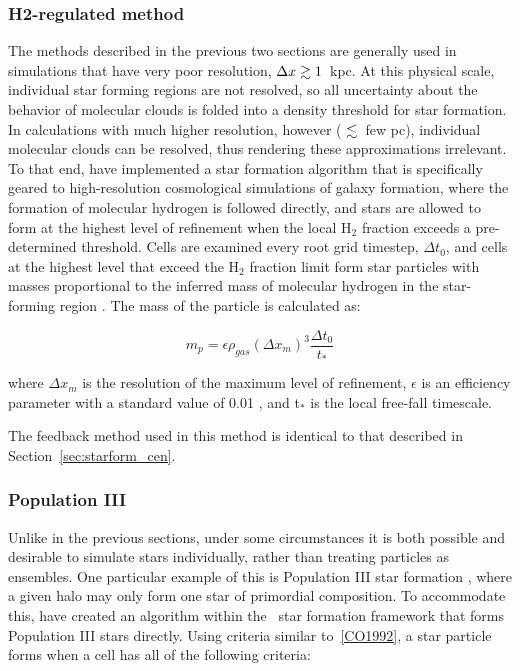 \subsubsection{H2-regulated method}
\label{sec:starform_H2reg}

The methods described in the previous two sections are generally used
in simulations that have very poor resolution, $\Delta x \gtrsim 1$~kpc.
At this physical scale, individual star forming regions are not
resolved, so all uncertainty about the behavior of molecular clouds is
folded into a density threshold for star formation.  In calculations
with much higher resolution, however ( $\lesssim$~few pc), individual
molecular clouds can be resolved, thus rendering these approximations
irrelevant.  To that end, \citet{2012ApJ...749...36K} have implemented
a star formation algorithm that is specifically geared to
high-resolution cosmological simulations of galaxy formation, where
the formation of molecular hydrogen is followed directly, and stars
are allowed to form at the highest level of refinement when the local
H$_2$ fraction exceeds a pre-determined threshold.  Cells are examined
every root grid timestep, $\Delta t_0$, and cells at the highest level
that exceed the H$_2$ fraction limit form star particles with masses
proportional to the inferred mass of molecular hydrogen in the
star-forming region
\citep{2008ApJ...689..865K,2009ApJ...693..216K,2010ApJ...709..308M}.
The mass of the particle is calculated as:

\begin{equation} 
m_p = \epsilon \rho_{gas} (\Delta x_{m})^3 \frac{\Delta t_0}{t_*}
\end{equation}

where $\Delta x_{m}$ is the resolution of the maximum level of
refinement, $\epsilon$ is an efficiency parameter with a standard
value of 0.01 \citep[as motivated by][]{2007ApJ...654..304K}, and
t$_*$ is the local free-fall timescale.

The feedback method used in this method is identical to that described
in Section~\ref{sec:starform_cen}.

\subsubsection{Population III}
\label{sec:starform_pop3}

Unlike in the previous sections, under some circumstances it is both
possible and desirable to simulate stars individually, rather than
treating particles as ensembles.  One particular example of this is
Population III star formation
\citep{ABN02,2007ApJ...654...66O,2008ApJ...685...40W,2009Sci...325..601T},
where a given halo may only form one star of primordial composition.
To accommodate this, \citet{2007ApJ...659L..87A,2008ApJ...685...40W, 2012MNRAS.427..311W} have created an
algorithm within the \enzo\ star formation framework that forms
Population III stars directly.  Using criteria similar
to~\ref{CO1992}, a star particle forms when a cell has all of the
following criteria:

